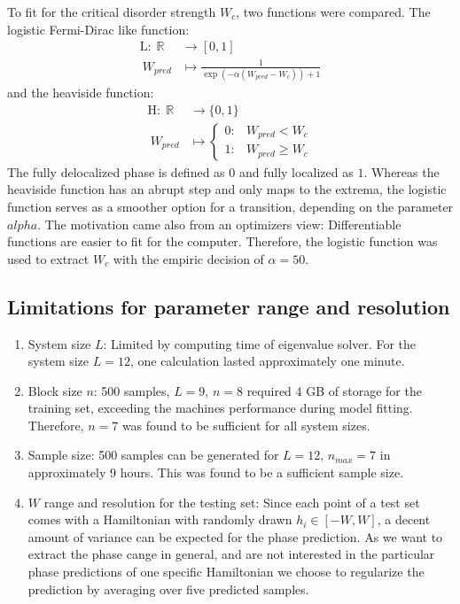 \documentclass[reprint,amsmath,amssymb,aps,prb]{revtex4-2}
\begin{document}
To fit for the critical disorder strength $W_c$, two functions were compared. The logistic Fermi-Dirac like function:
\begin{align}
\text{L} \colon \;\mathbb {R} &\to \left[0,1\right]\\
\ W_{pred}&\mapsto \frac{1}{\exp\left(-\alpha \left(W_{pred}-W_c\right)\right)+1}
\end{align}
and the heaviside function:
\begin{align}
\text{H} \colon \;
\mathbb {R} &\to \{0,1\}\\
\ W_{pred}&\mapsto 
\begin{cases}
0:&W_{pred}<W_c\\1:&W_{pred}\geq W_c
\end{cases}
	\end{align}
The fully delocalized phase is defined as $0$ and fully localized as $1$. Whereas the heaviside function has an abrupt step and only maps to the extrema, the logistic function serves as a smoother option for a transition, depending on the parameter $alpha$. The motivation came also from an optimizers view: Differentiable functions are easier to fit for the computer.\cite{Kyurkchiev2015} Therefore, the logistic function was used to extract $W_c$ with the empiric decision of $\alpha=50$.

\subsection{Limitations for parameter range and resolution}

\begin{enumerate}
	\item System size $L$: Limited by computing time of eigenvalue solver. For the system size $L=12$, one calculation lasted approximately one minute.
	\item Block size $n$: 500 samples, $L=9$, $n=8$ required 4 GB of storage for the training set, exceeding the machines performance during model fitting. Therefore, $n=7$ was found to be sufficient for all system sizes.
	\item Sample size: 500 samples can be generated for $L=12$, $n_{max}=7$ in approximately 9 hours. This was found to be a sufficient sample size.
	\item $W$ range and resolution for the testing set: Since each point of a test set comes with a Hamiltonian with randomly drawn $h_i\in\left[-W,W\right]$, a decent amount of variance can be expected for the phase prediction. As we want to extract the phase cange in general, and are not interested in the particular phase predictions of one specific Hamiltonian we choose to regularize the prediction by averaging over five predicted samples.
\end{enumerate}
\end{document}
